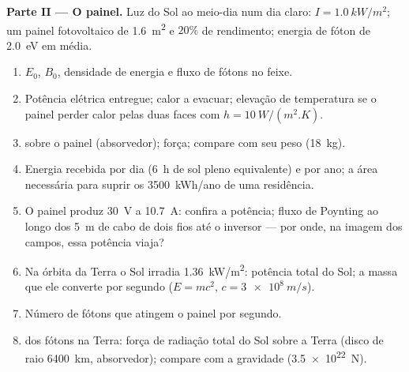 \begin{problem}
\medskip
\noindent\textbf{Parte II --- O painel.}
Luz do Sol ao meio-dia num dia claro: $I = \qty{1.0}{kW/m^2}$; um painel
fotovoltaico de \qty{1.6}{m^2} e $20\%$ de rendimento; energia de fóton de \qty{2.0}{eV}
em média.
\begin{enumerate}[resume]
  \item $E_0$, $B_0$, densidade de energia e fluxo de fótons no feixe.
  \item Potência elétrica entregue; calor a evacuar; elevação de
        temperatura se o painel perder calor pelas duas faces com $h = \qty{10}{W/(m^2.K)}$.
  \item {} sobre o painel (absorvedor); força; compare
        com seu peso (\qty{18}{kg}).
  \item Energia recebida por dia (\qty{6}{h} de sol pleno equivalente) e
        por ano; a área necessária para suprir os
        \qty{3500}{kWh/ano} de uma residência.
  \item O painel produz \qty{30}{V} a \qty{10.7}{A}: confira a potência;
        fluxo de Poynting ao longo dos \qty{5}{m} de cabo de dois fios até o
        inversor --- por onde, na imagem dos campos, essa potência
        viaja?
  \item Na órbita da Terra o Sol irradia \qty{1.36}{kW/m^2}: potência
        total do Sol; a massa que ele converte por segundo ($E = mc^2$,
        $c = \qty{3e8}{m/s}$).
  \item Número de fótons que atingem o painel por segundo.
  \item {} dos fótons na Terra: força de radiação total do
        Sol sobre a Terra (disco de raio \qty{6400}{km}, absorvedor);
        compare com a gravidade (\qty{3.5e22}{N}).
\end{enumerate}


\end{problem}
